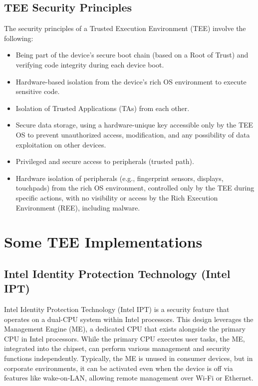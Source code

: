 \subsection{TEE Security Principles}

The security principles of a Trusted Execution Environment 
(TEE) involve the following:

\begin{itemize}
    \item Being part of the device's secure boot chain (based on a Root 
    of Trust) and verifying code integrity during each device boot.
    \item Hardware-based isolation from the device’s rich OS 
    environment to execute sensitive code.
    \item Isolation of Trusted Applications (TAs) from each other.
    \item Secure data storage, using a hardware-unique key accessible 
    only by the TEE OS to prevent unauthorized access, modification, 
    and any possibility of data exploitation on other devices.
    \item Privileged and secure access to peripherals (trusted path).
    \item Hardware isolation of peripherals (e.g., fingerprint sensors, 
    displays, touchpads) from the rich OS environment, controlled 
    only by the TEE during specific actions, with no visibility or 
    access by the Rich Execution Environment (REE), including 
    malware.
\end{itemize}

\section{Some TEE Implementations}
\subsection{Intel Identity Protection Technology (Intel IPT)}

Intel Identity Protection Technology (Intel IPT) is a security feature
that operates on a dual-CPU system within Intel processors. This
design leverages the Management Engine (ME), a dedicated CPU that
exists alongside the primary CPU in Intel processors. While the
primary CPU executes user tasks, the ME, integrated into the chipset,
can perform various management and security functions independently.
Typically, the ME is unused in consumer devices, but in corporate
environments, it can be activated even when the device is off via
features like wake-on-LAN, allowing remote management over Wi-Fi or
Ethernet.

